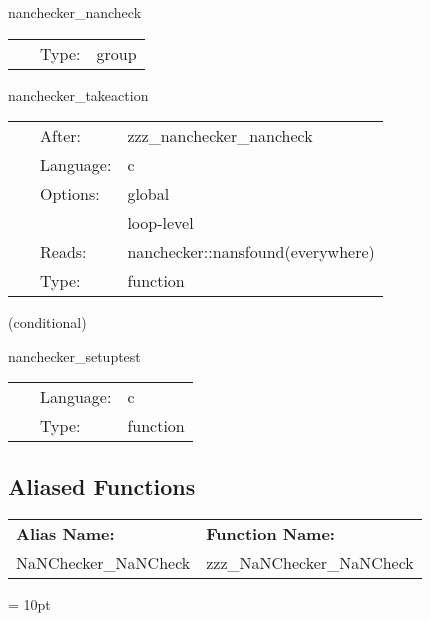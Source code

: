 \vspace{5mm}


\hspace{5mm} nanchecker\_nancheck 

\hspace{5mm}{\it check for nans and count them in nanchecker::nansfound } 


\hspace{5mm}

 \begin{tabular*}{160mm}{cll} 
~ & Type:  & group \\ 
\end{tabular*} 


\vspace{5mm}


\hspace{5mm} nanchecker\_takeaction 

\hspace{5mm}{\it output nanchecker::nanmask and take action according to nanchecker::action\_if\_found } 


\hspace{5mm}

 \begin{tabular*}{160mm}{cll} 
~ & After:  & zzz\_nanchecker\_nancheck \\ 
~ & Language:  & c \\ 
~ & Options:  & global \\ 
~& ~ &loop-level\\ 
~ & Reads:  & nanchecker::nansfound(everywhere) \\ 
~ & Type:  & function \\ 
\end{tabular*} 


\vspace{5mm}

   (conditional) 

\hspace{5mm} nanchecker\_setuptest 

\hspace{5mm}{\it set test grid function to nan } 


\hspace{5mm}

 \begin{tabular*}{160mm}{cll} 
~ & Language:  & c \\ 
~ & Type:  & function \\ 
\end{tabular*} 


\subsection*{Aliased Functions}

\hspace{5mm}

 \begin{tabular*}{160mm}{ll} 

{\bf Alias Name:} ~~~~~~~ & {\bf Function Name:} \\ 
NaNChecker\_NaNCheck & zzz\_NaNChecker\_NaNCheck \\ 
\end{tabular*} 



\vspace{5mm}\parskip = 10pt 
